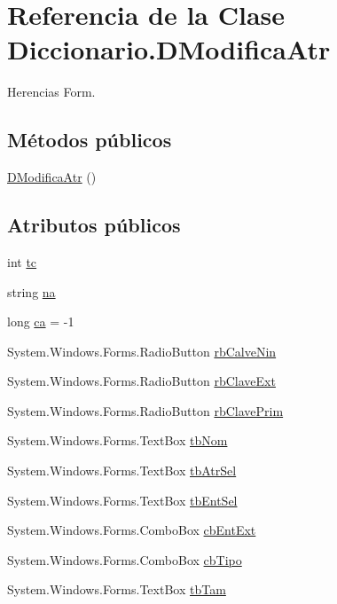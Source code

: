 \hypertarget{class_diccionario_1_1_d_modifica_atr}{\section{Referencia de la Clase Diccionario.\-D\-Modifica\-Atr}
\label{class_diccionario_1_1_d_modifica_atr}
}


Herencias Form.

\subsection*{Métodos públicos}
\begin{DoxyCompactItemize}
\item 
\hyperlink{class_diccionario_1_1_d_modifica_atr_afd382204403f13db0f61de41301fca86}{D\-Modifica\-Atr} ()
\end{DoxyCompactItemize}
\subsection*{Atributos públicos}
\begin{DoxyCompactItemize}
\item 
int \hyperlink{class_diccionario_1_1_d_modifica_atr_af4846e255edc43368622e4137dd67c01}{tc}
\item 
string \hyperlink{class_diccionario_1_1_d_modifica_atr_aa1c71bfdad97a9519170ff060d3d6991}{na}
\item 
long \hyperlink{class_diccionario_1_1_d_modifica_atr_a8b3dd56048b3a18db120e2c6cf59f13c}{ca} = -\/1
\item 
System.\-Windows.\-Forms.\-Radio\-Button \hyperlink{class_diccionario_1_1_d_modifica_atr_a151c61c3393029b48cd0b72cccdfd4e5}{rb\-Calve\-Nin}
\item 
System.\-Windows.\-Forms.\-Radio\-Button \hyperlink{class_diccionario_1_1_d_modifica_atr_aa0ab5953af16bf77bebfbedcb8d18edb}{rb\-Clave\-Ext}
\item 
System.\-Windows.\-Forms.\-Radio\-Button \hyperlink{class_diccionario_1_1_d_modifica_atr_a0e0dbba9ca1f122d708f88303b28cb5b}{rb\-Clave\-Prim}
\item 
System.\-Windows.\-Forms.\-Text\-Box \hyperlink{class_diccionario_1_1_d_modifica_atr_a79eef6fea893d55e4b8a66332f8cb0e5}{tb\-Nom}
\item 
System.\-Windows.\-Forms.\-Text\-Box \hyperlink{class_diccionario_1_1_d_modifica_atr_a5ae23b45d7722ea5f3b719b9d73921d8}{tb\-Atr\-Sel}
\item 
System.\-Windows.\-Forms.\-Text\-Box \hyperlink{class_diccionario_1_1_d_modifica_atr_ababb862ae620c6e1e83641b83ab9f2d8}{tb\-Ent\-Sel}
\item 
System.\-Windows.\-Forms.\-Combo\-Box \hyperlink{class_diccionario_1_1_d_modifica_atr_a05f0a97003cb80ba751bd1afe3896f02}{cb\-Ent\-Ext}
\item 
System.\-Windows.\-Forms.\-Combo\-Box \hyperlink{class_diccionario_1_1_d_modifica_atr_a2da36e4842e54585f5a38bff836ad5cd}{cb\-Tipo}
\item 
System.\-Windows.\-Forms.\-Text\-Box \hyperlink{class_diccionario_1_1_d_modifica_atr_a877a19710cd26a5fb06c38f02df46b97}{tb\-Tam}
\end{DoxyCompactItemize}
